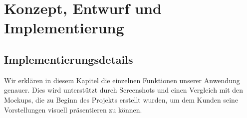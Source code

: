 \chapter{Konzept, Entwurf und Implementierung}
\label{cha:implementierung}

\section{Implementierungsdetails}
\label{sec:implementierung:implementierungsdetails}

Wir erklären in diesem Kapitel die einzelnen Funktionen unserer Anwendung genauer. Dies wird unterstützt durch Screenshots und einen Vergleich mit den Mockups, die zu Beginn des Projekts erstellt wurden, um dem Kunden seine Vorstellungen visuell präsentieren zu können.\\

